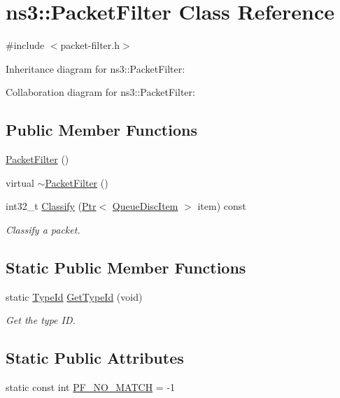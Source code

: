 \hypertarget{classns3_1_1PacketFilter}{}\section{ns3\+:\+:Packet\+Filter Class Reference}
\label{classns3_1_1PacketFilter}


{\ttfamily \#include $<$packet-\/filter.\+h$>$}



Inheritance diagram for ns3\+:\+:Packet\+Filter\+:


Collaboration diagram for ns3\+:\+:Packet\+Filter\+:
\subsection*{Public Member Functions}
\begin{DoxyCompactItemize}
\item 
\hyperlink{classns3_1_1PacketFilter_a4c9b19f4b91684d30d8a769489b534e7}{Packet\+Filter} ()
\item 
virtual \hyperlink{classns3_1_1PacketFilter_a75ac3b124f9be0f2438cb281eefd04e8}{$\sim$\+Packet\+Filter} ()
\item 
int32\+\_\+t \hyperlink{classns3_1_1PacketFilter_aa7850f7e234e128740917d9b4c5c022d}{Classify} (\hyperlink{classns3_1_1Ptr}{Ptr}$<$ \hyperlink{classns3_1_1QueueDiscItem}{Queue\+Disc\+Item} $>$ item) const 
\begin{DoxyCompactList}\small\item\em Classify a packet. \end{DoxyCompactList}\end{DoxyCompactItemize}
\subsection*{Static Public Member Functions}
\begin{DoxyCompactItemize}
\item 
static \hyperlink{classns3_1_1TypeId}{Type\+Id} \hyperlink{classns3_1_1PacketFilter_a00943b7d9bca95f65c8e224d5a159380}{Get\+Type\+Id} (void)
\begin{DoxyCompactList}\small\item\em Get the type ID. \end{DoxyCompactList}\end{DoxyCompactItemize}
\subsection*{Static Public Attributes}
\begin{DoxyCompactItemize}
\item 
static const int \hyperlink{classns3_1_1PacketFilter_a5395721034f6c71a021436b928a0cd95}{P\+F\+\_\+\+N\+O\+\_\+\+M\+A\+T\+CH} = -\/1
\end{DoxyCompactItemize}
